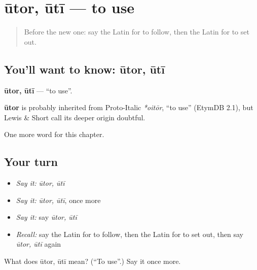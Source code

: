 \section[ūtor, ūtī]{ūtor, ūtī — to use}

\label{lesson:LA-C235-utor}



\begin{quote}
Before the new one: say the Latin for to follow, then the Latin for to set out.
\end{quote}

\subsection*{You'll want to know: ūtor, ūtī}
\textbf{ūtor, ūtī} — \textquotedblleft{}to use\textquotedblright{}.

\begin{cousinweb}
\textbf{ūtor} is probably inherited from Proto-Italic \emph{*oitōr}, \textquotedblleft{}to use\textquotedblright{} (EtymDB 2.1), but Lewis \& Short call its deeper origin doubtful.
\end{cousinweb}

\begin{grammarlens}[title={What you've built}]
One more word for this chapter.
\end{grammarlens}

\subsection*{Your turn}
\begin{itemize}
\raggedright
  \item \emph{Say it:} \emph{ūtor, ūtī}
  \item \emph{Say it:} \emph{ūtor, ūtī}, once more
  \item \emph{Say it:} say \emph{ūtor, ūtī}
  \item \emph{Recall:} say the Latin for to follow, then the Latin for to set out, then say \emph{ūtor, ūtī} again
\end{itemize}

\begin{tcolorbox}[breakable,colback=teal!4,colframe=teal!35!black,title={Before you move on}]
What does ūtor, ūtī mean? (\textquotedblleft{}To use\textquotedblright{}.) Say it once more.
\end{tcolorbox}
